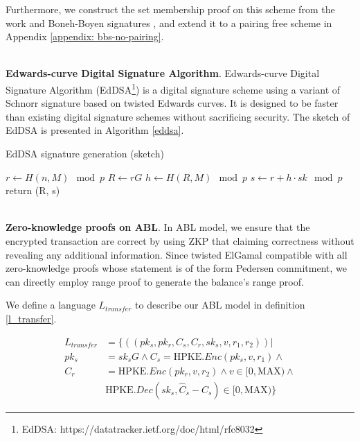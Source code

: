 \documentclass{article}
\begin{document}
Furthermore, we construct the set membership proof on this scheme from the work \cite{camenisch2008efficient} and Boneh-Boyen signatures \cite{jao2009boneh}, and extend it to a pairing free scheme in Appendix \ref{appendix: bbs-no-pairing}.

~\\
\noindent\textbf{Edwards-curve Digital Signature Algorithm}. Edwards-curve Digital Signature Algorithm (EdDSA\footnote{EdDSA: https://datatracker.ietf.org/doc/html/rfc8032}) is a digital signature scheme using a variant of Schnorr signature based on twisted Edwards curves. It is designed to be faster than existing digital signature schemes without sacrificing security. The sketch of EdDSA is presented in Algorithm \ref{eddsa}.

\begin{algorithm}
 \caption{EdDSA signature generation (sketch)}
 \label{eddsa}
 \LinesNumbered
 
 $r \gets H(n, M) \mod{p}$ \;
 $R \gets rG$ \;
 $h \gets H(R, M) \mod{p}$ \;
 $s \gets r + h \cdot sk \mod{p}$ \;
  return (R, s)
\end{algorithm}

~\\
\noindent\textbf{Zero-knowledge proofs on ABL}. In ABL model, we ensure that the encrypted transaction are correct by using ZKP that claiming correctness without revealing any additional information. Since twisted ElGamal compatible with all zero-knowledge proofs whose statement is of the form Pedersen commitment, we can directly employ range proof \cite{bunz2018bulletproofs} to generate the balance's range proof. 

We define a language $L_{transfer}$ to describe our ABL model in definition \ref{l_transfer}.

\begin{equation}\label{l_transfer}
\begin{aligned}
    L_{transfer} &= \{((pk_s, pk_r, C_s, C_r, sk_s, v, r_1, r_2)) | \\ 
        pk_s &= sk_sG \land C_s = \mbox{HPKE}.Enc(pk_s,v, r_1) \land \\
        C_r &=  \mbox{HPKE}.Enc(pk_r,v, r_2) \land v \in [0, \mbox{MAX}) \land \\
        &\mbox{HPKE}.Dec(sk_s, \hat{C}_s - C_s) \in [0, \mbox{MAX})\}
\end{aligned}
\end{equation}
\end{document}
